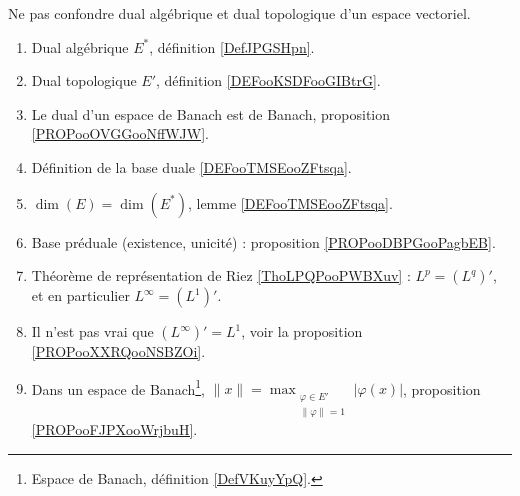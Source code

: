      \label{THEMEooULGFooPscFJC}

Ne pas confondre dual algébrique et dual topologique d'un espace vectoriel.

\begin{enumerate}
	\item
	      Dual algébrique \( E^*\), définition \ref{DefJPGSHpn}.
	\item
	      Dual topologique \( E'\), définition \ref{DEFooKSDFooGIBtrG}.
	\item
	      Le dual d'un espace de Banach est de Banach, proposition \ref{PROPooOVGGooNffWJW}.
	\item
	      Définition de la base duale \ref{DEFooTMSEooZFtsqa}.
	\item
	      \( \dim(E)=\dim(E^*)\), lemme \ref{DEFooTMSEooZFtsqa}.
	\item
	      Base préduale (existence, unicité) : proposition \ref{PROPooDBPGooPagbEB}.
	\item
	      Théorème de représentation de Riez \ref{ThoLPQPooPWBXuv} : \( L^p=(L^q)'\), et en particulier \( L^{\infty}=(L^1)'\).
	\item
	      Il n'est pas vrai que \( (L^{\infty})'=L^1\), voir la proposition \ref{PROPooXXRQooNSBZOi}.
	\item
	      Dans un espace de Banach\footnote{Espace de Banach, définition \ref{DefVKuyYpQ}.}, \( \| x \|=\max_{\substack{\varphi\in E'\\\| \varphi \|=1}}| \varphi(x) |\), proposition \ref{PROPooFJPXooWrjbuH}.
\end{enumerate}

